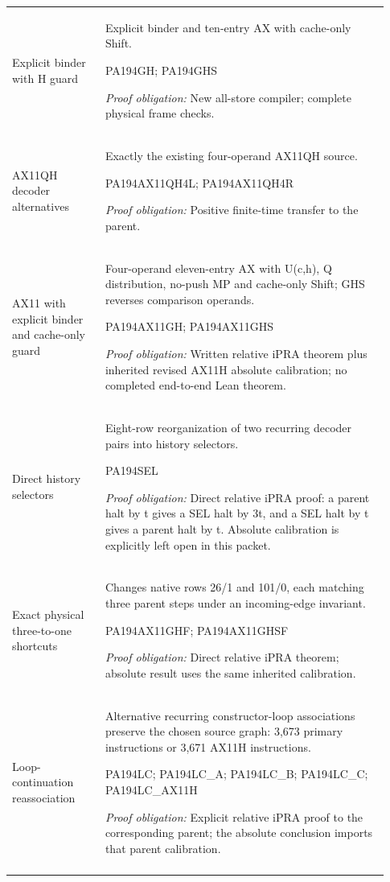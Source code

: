 \begin{longtable}{>{\raggedright\arraybackslash}p{0.23\linewidth}>{\raggedright\arraybackslash}p{0.70\linewidth}}
Explicit binder with H guard & Explicit binder and ten-entry AX with cache-only Shift. \par\smallskip PA194GH; PA194GHS \par\smallskip\emph{Proof obligation:} New all-store compiler; complete physical frame checks.\\\addlinespace[5pt]
AX11QH decoder alternatives & Exactly the existing four-operand AX11QH source. \par\smallskip PA194AX11QH4L; PA194AX11QH4R \par\smallskip\emph{Proof obligation:} Positive finite-time transfer to the parent.\\\addlinespace[5pt]
AX11 with explicit binder and cache-only guard & Four-operand eleven-entry AX with U(c,h), Q distribution, no-push MP and cache-only Shift; GHS reverses comparison operands. \par\smallskip PA194AX11GH; PA194AX11GHS \par\smallskip\emph{Proof obligation:} Written relative iPRA theorem plus inherited revised AX11H absolute calibration; no completed end-to-end Lean theorem.\\\addlinespace[5pt]
Direct history selectors & Eight-row reorganization of two recurring decoder pairs into history selectors. \par\smallskip PA194SEL \par\smallskip\emph{Proof obligation:} Direct relative iPRA proof: a parent halt by t gives a SEL halt by 3t, and a SEL halt by t gives a parent halt by t. Absolute calibration is explicitly left open in this packet.\\\addlinespace[5pt]
Exact physical three-to-one shortcuts & Changes native rows 26/\allowbreak{}1 and 101/\allowbreak{}0, each matching three parent steps under an incoming-edge invariant. \par\smallskip PA194AX11GHF; PA194AX11GHSF \par\smallskip\emph{Proof obligation:} Direct relative iPRA theorem; absolute result uses the same inherited calibration.\\\addlinespace[5pt]
Loop-continuation reassociation & Alternative recurring constructor-loop associations preserve the chosen source graph: 3,673 primary instructions or 3,671 AX11H instructions. \par\smallskip PA194LC; PA194LC\_A; PA194LC\_B; PA194LC\_C; PA194LC\_AX11H \par\smallskip\emph{Proof obligation:} Explicit relative iPRA proof to the corresponding parent; the absolute conclusion imports that parent calibration.\\\addlinespace[5pt]

\end{longtable}
